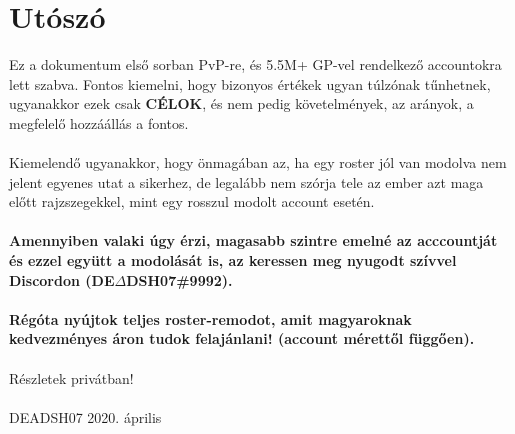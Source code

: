 \documentclass[11pt]{report}
\begin{document}

\chapter{Utószó}
Ez a dokumentum első sorban PvP-re, és 5.5M+ GP-vel rendelkező accountokra lett szabva. Fontos kiemelni, hogy bizonyos értékek ugyan túlzónak tűnhetnek, ugyanakkor ezek csak \textbf{CÉLOK}, és nem pedig követelmények, az arányok, a megfelelő hozzáállás a fontos.
\\
\\
Kiemelendő ugyanakkor, hogy önmagában az, ha egy roster jól van modolva nem jelent egyenes utat a sikerhez, de legalább nem szórja tele az ember azt maga előtt rajzszegekkel, mint egy rosszul modolt account esetén.
\\
\\
\Large \textbf{Amennyiben valaki úgy érzi, magasabb szintre emelné az acccountját és ezzel együtt a modolását is, az keressen meg nyugodt szívvel Discordon (DE$\Delta$DSH07\#9992). 
\\
\\
Régóta nyújtok teljes roster-remodot, amit magyaroknak kedvezményes áron tudok felajánlani!
(account mérettől függően).}
\\
\\
Részletek privátban!
\\
\\
\LARGE\textcopyright DEADSH07 2020. április
\end{document}
